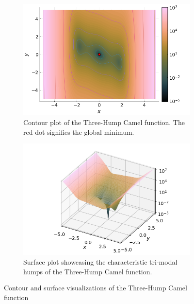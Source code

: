   \begin{figure}[ht!]
    \centering
    \begin{subfigure}[b]{0.45\textwidth}
      \centering
      \includegraphics[width=\textwidth]{img/test_functions/three_hump_camel_contour.png}
      \caption{
        Contour plot of the Three-Hump Camel function.
        The red dot signifies the global minimum.
      }
      \label{fig:app:test:three-hump:contour}
    \end{subfigure}
    \hfill
    \begin{subfigure}[b]{0.45\textwidth}
      \centering
      \includegraphics[width=\textwidth]{img/test_functions/three_hump_camel_surface.png}
      \caption{
        Surface plot showcasing the characteristic tri-modal humps of the
        Three-Hump Camel function.
      }
      \label{fig:app:test:three-hump:surface}
    \end{subfigure}
    \caption{Contour and surface visualizations of the Three-Hump Camel function}
    \label{fig:app:test:three-hump}
  \end{figure}
